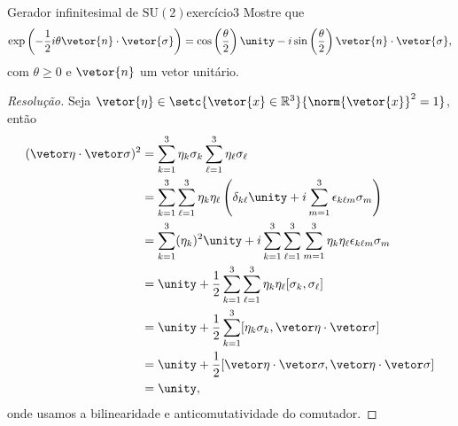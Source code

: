 \begin{exercício}{Gerador infinitesimal de \(\mathrm{SU}(2)\)}{exercício3}
    Mostre que
    \begin{equation*}
        \exp\left(-\frac12i\theta \vetor{n} \cdot \vetor{\sigma}\right) = \cos\left(\frac{\theta}{2}\right) \unity - i \sin\left(\frac{\theta}{2}\right)\vetor{n}\cdot\vetor{\sigma},
    \end{equation*}
    com \(\theta \geq 0\) e \(\vetor{n}\) um vetor unitário.
\end{exercício}
\begin{proof}[Resolução]
    Seja \(\vetor{\eta} \in \setc{\vetor{x} \in \mathbb{R}^3}{\norm{\vetor{x}}^2 = 1}\), então
    \begin{align*}
        (\vetor \eta \cdot \vetor \sigma)^2 &= \sum_{k=1}^3 \eta_k \sigma_k \sum_{\ell = 1}^3 \eta_\ell \sigma_\ell\\
                                        &= \sum_{k=1}^3\sum_{\ell=1}^3 \eta_k \eta_\ell \left(\delta_{k\ell}\unity + i \sum_{m = 1}^3 \epsilon_{k\ell m}\sigma_m\right)\\
                                        &= \sum_{k=1}^3 (\eta_k)^2 \unity + i\sum_{k=1}^3\sum_{\ell=1}^3 \sum_{m = 1}^3 \eta_k \eta_\ell\epsilon_{k\ell m}\sigma_m\\
                                        &= \unity + \frac12 \sum_{k=1}^3\sum_{\ell=1}^3 \eta_k \eta_\ell [\sigma_k, \sigma_\ell]\\
                                        &= \unity + \frac12 \sum_{k=1}^3 [\eta_k \sigma_k, \vetor \eta \cdot \vetor \sigma]\\
                                        &= \unity + \frac12 [\vetor \eta\cdot \vetor \sigma, \vetor \eta\cdot \vetor \sigma]\\
                                        &= \unity,
    \end{align*}
    onde usamos a bilinearidade e anticomutatividade do comutador.


\end{proof}
